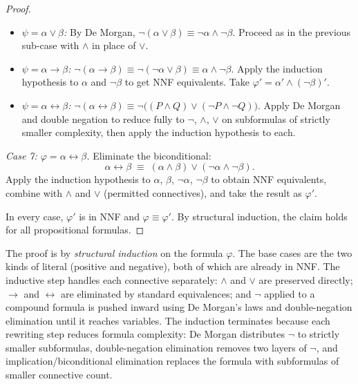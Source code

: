 \begin{proof}
\begin{itemize}
  \item \textit{$\psi = \alpha \vee \beta$:}
        By De Morgan, $\neg(\alpha \vee \beta) \equiv \neg\alpha \wedge
        \neg\beta$. Proceed as in the previous sub-case with $\wedge$ in
        place of $\vee$.

  \item \textit{$\psi = \alpha \rightarrow \beta$:}
        $\neg(\alpha \rightarrow \beta) \equiv \neg(\neg\alpha \vee \beta)
        \equiv \alpha \wedge \neg\beta$. Apply the induction hypothesis to
        $\alpha$ and $\neg\beta$ to get NNF equivalents. Take $\varphi' =
        \alpha' \wedge (\neg\beta)'$.

  \item \textit{$\psi = \alpha \leftrightarrow \beta$:}
        $\neg(\alpha \leftrightarrow \beta) \equiv \neg\bigl((P \wedge Q)
        \vee (\neg P \wedge \neg Q)\bigr)$. Apply De Morgan and double
        negation to reduce fully to $\neg$, $\wedge$, $\vee$ on subformulas
        of strictly smaller complexity, then apply the induction hypothesis
        to each.
\end{itemize}

\medskip
\textit{Case 7: $\varphi = \alpha \leftrightarrow \beta$.}
Eliminate the biconditional:
\[
    \alpha \leftrightarrow \beta \;\equiv\; (\alpha \wedge \beta) \vee
    (\neg\alpha \wedge \neg\beta).
\]
Apply the induction hypothesis to $\alpha$, $\beta$, $\neg\alpha$,
$\neg\beta$ to obtain NNF equivalents, combine with $\wedge$ and $\vee$
(permitted connectives), and take the result as $\varphi'$.

\medskip
In every case, $\varphi'$ is in NNF and $\varphi \equiv \varphi'$. By
structural induction, the claim holds for all propositional formulas. \AsReq
\end{proof}

\begin{remark*}
The proof is by \emph{structural induction} on the formula $\varphi$. The
base cases are the two kinds of literal (positive and negative), both of
which are already in NNF. The inductive step handles each connective
separately: $\wedge$ and $\vee$ are preserved directly; $\rightarrow$ and
$\leftrightarrow$ are eliminated by standard equivalences; and $\neg$
applied to a compound formula is pushed inward using De Morgan's laws and
double-negation elimination until it reaches variables. The induction
terminates because each rewriting step reduces formula complexity: De Morgan
distributes $\neg$ to strictly smaller subformulas, double-negation
elimination removes two layers of $\neg$, and implication/biconditional
elimination replaces the formula with subformulas of smaller connective
count.
\end{remark*}

